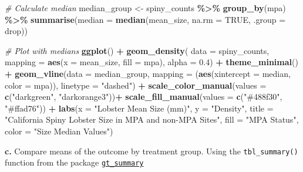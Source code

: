 \documentclass[
]{article}
\newenvironment{Shaded}{\begin{snugshade}}{\end{snugshade}}
\newcommand{\AttributeTok}[1]{\textcolor[rgb]{0.13,0.29,0.53}{#1}}
\newcommand{\CommentTok}[1]{\textcolor[rgb]{0.56,0.35,0.01}{\textit{#1}}}
\newcommand{\ConstantTok}[1]{\textcolor[rgb]{0.56,0.35,0.01}{#1}}
\newcommand{\FloatTok}[1]{\textcolor[rgb]{0.00,0.00,0.81}{#1}}
\newcommand{\FunctionTok}[1]{\textcolor[rgb]{0.13,0.29,0.53}{\textbf{#1}}}
\newcommand{\NormalTok}[1]{#1}
\newcommand{\OtherTok}[1]{\textcolor[rgb]{0.56,0.35,0.01}{#1}}
\newcommand{\SpecialCharTok}[1]{\textcolor[rgb]{0.81,0.36,0.00}{\textbf{#1}}}
\newcommand{\StringTok}[1]{\textcolor[rgb]{0.31,0.60,0.02}{#1}}
\begin{document}
\begin{Shaded}
\begin{Highlighting}[]
\CommentTok{\# Calculate median }
\NormalTok{median\_group }\OtherTok{\textless{}{-}}\NormalTok{ spiny\_counts }\SpecialCharTok{\%\textgreater{}\%} 
    \FunctionTok{group\_by}\NormalTok{(mpa) }\SpecialCharTok{\%\textgreater{}\%} 
    \FunctionTok{summarise}\NormalTok{(}\AttributeTok{median =} \FunctionTok{median}\NormalTok{(mean\_size, }\AttributeTok{na.rm =} \ConstantTok{TRUE}\NormalTok{, }\AttributeTok{.group =}\NormalTok{ drop))}

\CommentTok{\# Plot with medians }
\FunctionTok{ggplot}\NormalTok{() }\SpecialCharTok{+} 
    \FunctionTok{geom\_density}\NormalTok{(}
        \AttributeTok{data =}\NormalTok{ spiny\_counts,}
        \AttributeTok{mapping =} \FunctionTok{aes}\NormalTok{(}\AttributeTok{x =}\NormalTok{ mean\_size, }\AttributeTok{fill =}\NormalTok{ mpa),}
        \AttributeTok{alpha =} \FloatTok{0.4}\NormalTok{) }\SpecialCharTok{+} 
    \FunctionTok{theme\_minimal}\NormalTok{() }\SpecialCharTok{+}
    \FunctionTok{geom\_vline}\NormalTok{(}\AttributeTok{data =}\NormalTok{ median\_group,}
        \AttributeTok{mapping =}\NormalTok{ (}\FunctionTok{aes}\NormalTok{(}\AttributeTok{xintercept =}\NormalTok{ median, }
                       \AttributeTok{color =}\NormalTok{ mpa)), }
        \AttributeTok{linetype =} \StringTok{"dashed"}\NormalTok{) }\SpecialCharTok{+} 
    \FunctionTok{scale\_color\_manual}\NormalTok{(}\AttributeTok{values =} \FunctionTok{c}\NormalTok{(}\StringTok{"darkgreen"}\NormalTok{, }\StringTok{"darkorange3"}\NormalTok{))}\SpecialCharTok{+}
    \FunctionTok{scale\_fill\_manual}\NormalTok{(}\AttributeTok{values =} \FunctionTok{c}\NormalTok{(}\StringTok{"\#488f30"}\NormalTok{, }\StringTok{"\#ffad76"}\NormalTok{)) }\SpecialCharTok{+} 
    \FunctionTok{labs}\NormalTok{(}\AttributeTok{x =} \StringTok{"Lobster Mean Size (mm)"}\NormalTok{, }
         \AttributeTok{y =} \StringTok{"Density"}\NormalTok{, }
         \AttributeTok{title =} \StringTok{"California Spiny Lobster Size in MPA and non{-}MPA Sites"}\NormalTok{, }
         \AttributeTok{fill =} \StringTok{"MPA Status"}\NormalTok{, }
         \AttributeTok{color =} \StringTok{"Size Median Values"}\NormalTok{) }
\end{Highlighting}
\end{Shaded}

\textbf{c.} Compare means of the outcome by treatment group. Using the
\texttt{tbl\_summary()} function from the package
\href{https://www.danieldsjoberg.com/gtsummary/articles/tbl_summary.html}{\texttt{gt\_summary}}
\end{document}
